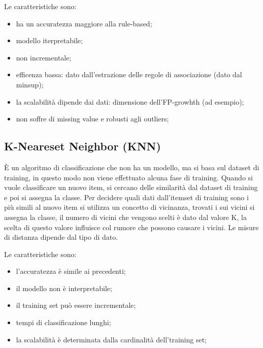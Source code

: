 \documentclass[12pt]{article}
\begin{document}
Le caratteristiche sono:
\begin{itemize}
    \item ha un accuratezza maggiore alla rule-based;
    \item modello iterpretabile;
    \item non incrementale;
    \item efficenza bassa: dato dall'estrazione delle regole di associazione (dato dal minsup);
    \item la scalabilit\`a dipende dai dati: dimensione dell'FP-growhth (ad esempio);
    \item non soffre di missing value e robusti agli outliers;
\end{itemize}


\subsection{K-Neareset Neighbor (KNN)}
\`E un algoritmo di classificazione che non ha un modello, ma si basa sul dataset di training, in questo modo non viene effettuato alcuna fase di training. Quando si vuole classificare un nuovo item, si cercano delle similarit\`a dal dataset di training e poi si assegna la classe. Per decidere quali dati dall'itemset di training sono i pi\`u simili al nuovo item si utilizza un concetto di vicinanza, trovati i sui vicini si assegna la classe, il numero di vicini che vengono scelti \`e dato dal valore K, la scelta di questo valore influisce col rumore che possono causare i vicini. Le misure di distanza dipende dal tipo di dato.

Le caratteristiche sono:
\begin{itemize}
    \item l'accuratezza \`e simile ai precedenti;
    \item il modello non \`e interpretabile;
    \item il training set pu\`o essere incrementale;
    \item tempi di classificazione lunghi;
    \item la scalabilit\`a \`e determinata dalla cardinalit\`a dell'training set;
\end{itemize}
\end{document}
